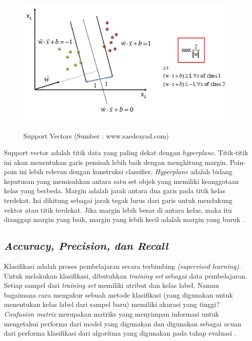 \begin{figure}[H]
	\centering
	\includegraphics[width=13cm, height=7.3cm]{gambar/index3_souoaz}
	\caption{Support Vectors (Sumber : www.saedsayad.com)}
	\label{index3_souoaz}
\end{figure}

\par Support vector adalah titik data yang paling dekat dengan \textit{hyperplane}. Titik-titik ini akan menentukan garis pemisah lebih baik dengan menghitung margin. Poin-poin ini lebih relevan dengan konstruksi classifier. \textit{Hyperplane} adalah bidang keputusan yang memisahkan antara satu set objek yang memiliki keanggotaan kelas yang berbeda. Margin adalah jarak antara dua garis pada titik kelas terdekat. Ini dihitung sebagai jarak tegak lurus dari garis untuk mendukung vektor atau titik terdekat. Jika margin lebih besar di antara kelas, maka itu dianggap margin yang baik, margin yang lebih kecil adalah margin yang buruk \citep{Zhibin2008}.


\subsection{\textit{Accuracy, Precision, dan Recall}}
\par Klasifikasi adalah proses pembelajaran secara
terbimbing \textit{(supervised learning)}. Untuk melakukan klasifikasi, dibutuhkan \textit{training set} sebagai data pembelajaran. Setiap sampel dari \textit{training set} memiliki atribut dan kelas label. Namun bagaimana cara mengukur sebuah metode klasifikasi (yang digunakan untuk menentukan kelas label dari sampel baru) memiliki akurasi yang tinggi? \textit{Confusion matrix} merupakan matriks yang menyimpan informasi untuk mengetahui performa dari model yang digunakan dan digunakan sebagai acuan dari performa klasifikasi dari algoritma yang digunakan pada tahap evaluasi \citep{Ariza18}.


